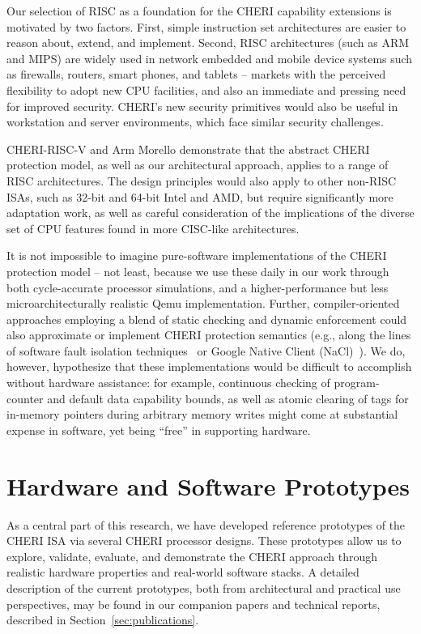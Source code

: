 Our selection of RISC as a foundation for the CHERI capability extensions
is motivated by two factors.
First, simple instruction set architectures are easier to reason about, extend, and implement.
Second, RISC architectures (such as ARM and MIPS) are widely used in network embedded
and mobile device systems such as firewalls, routers, smart phones, and tablets -- markets
with the perceived
flexibility to adopt new CPU facilities, and also an immediate and pressing
need for improved security.
CHERI's new security primitives would also be useful in workstation and server environments,
which face similar security challenges.

CHERI-RISC-V and Arm Morello demonstrate that the abstract CHERI protection
model, as well as our architectural approach, applies to a range of RISC
architectures.
The design principles would also apply to other non-RISC ISAs, such as 32-bit and
64-bit Intel and AMD, but require significantly more adaptation work, as well as careful
consideration of the implications of the diverse set of CPU features found in more CISC-like
architectures.

It is not impossible to imagine pure-software implementations of the CHERI
protection model -- not least, because we use these daily in our work through
both cycle-accurate processor simulations, and a higher-performance but less
microarchitecturally realistic Qemu implementation.
Further, compiler-oriented approaches employing a blend of static checking and
dynamic enforcement could also approximate or implement CHERI protection
semantics (e.g., along the lines of software fault isolation
techniques~\cite{wahbe:sfi} or Google Native Client (NaCl)~\cite{yee:nacl}).
We do, however, hypothesize that these implementations would be difficult to
accomplish without hardware assistance: for example, continuous checking of
program-counter and default data capability bounds, as well as atomic clearing
of tags for in-memory pointers during arbitrary memory writes might come at
substantial expense in software, yet being ``free'' in supporting hardware.

\section{Hardware and Software Prototypes}

As a central part of this research, we have developed reference prototypes of
the CHERI ISA via several CHERI processor designs.
These prototypes allow us to explore,
validate, evaluate, and demonstrate the CHERI approach through realistic
hardware properties and real-world software stacks.
A detailed description of the current prototypes, both from architectural and
practical use perspectives, may be found in our companion papers and technical
reports, described in Section~\ref{sec:publications}.

